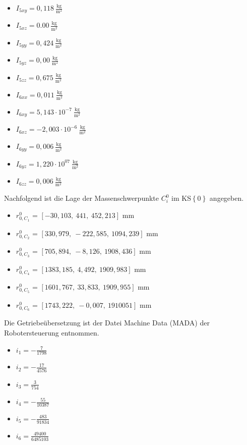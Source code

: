 \begin{itemize}
	\item $I_{5xy} = 0,118~\frac{\text{kg}}{\text{m}^2}$
	\item $I_{5xz} = 0.00~\frac{\text{kg}}{\text{m}^2}$
	\item $I_{5yy} = 0,424~\frac{\text{kg}}{\text{m}^2}$
	\item $I_{5yz} = 0,00~\frac{\text{kg}}{\text{m}^2}$
	\item $I_{5zz} = 0,675~\frac{\text{kg}}{\text{m}^2}$
	\\
	\item $I_{6xx} = 0,011~\frac{\text{kg}}{\text{m}^2}$
	\item $I_{6xy} = 5,143\cdot10^{-7}~\frac{\text{kg}}{\text{m}^2}$
	\item $I_{6xz} = -2,003\cdot10^{-6}~\frac{\text{kg}}{\text{m}^2}$
	\item $I_{6yy} = 0,006~\frac{\text{kg}}{\text{m}^2}$
	\item $I_{6yz} = 1,220\cdot10^{07}~\frac{\text{kg}}{\text{m}^2}$
	\item $I_{6zz} = 0,006~\frac{\text{kg}}{\text{m}^2}$
\end{itemize}
%
Nachfolgend ist die Lage der Massenschwerpunkte $C_i^0$ im KS$\left\{0\right\}$ angegeben. 
% 
\begin{itemize}
	\item $r_{0,C_1}^0$ = $\left[-30,103,~441,~452,213\right]$ mm
	\item $r_{0,C_2}^0$ = $\left[330,979,~-222,585,~1094,239\right]$ mm
	\item $r_{0,C_3}^0$ = $\left[705,894,~-8,126,~1908,436\right]$ mm
	\item $r_{0,C_4}^0$ = $\left[1383,185,~4,492,~1909,983\right]$ mm
	\item $r_{0,C_5}^0$ = $\left[1601,767,~33,833,~1909,955\right]$ mm
	\item $r_{0,C_6}^0$ = $\left[1743,222,~-0,007,~1910 051\right]$ mm
\end{itemize}
%
Die Getriebeübersetzung ist der Datei Machine Data (MADA) der Robotersteuerung entnommen.
%
\begin{itemize}
	\item $i_1 = -\frac{7}{1798}$
	\item $i_2 = -\frac{17}{4576}$
	\item $i_3 = \frac{3}{754}$
	\item $i_4 = -\frac{55}{10387}$
	\item $i_5 = -\frac{483}{91834}$
	\item $i_6 = \frac{49400}{6485103}$
\end{itemize}
